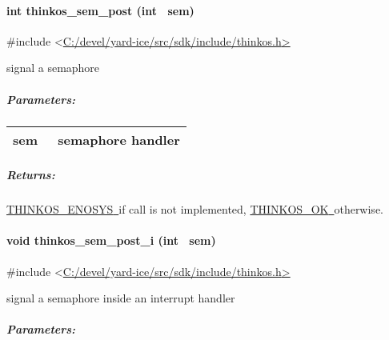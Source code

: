 {\paragraph{\texorpdfstring{{int thinkos\_sem\_post (int
~sem)}}{int thinkos\_sem\_post (int ~sem)}}\label{int-thinkos_sem_post-int-sem}

{}

{\#include
\textless{}}{\protect\hyperlink{h.pkwqa1}{C:/devel/yard-ice/src/sdk/include/thinkos.h}}{\protect\hyperlink{h.pkwqa1}{\textgreater{}}}

{signal a semaphore }

{}

\subparagraph{\texorpdfstring{{Parameters:}}{Parameters:}}\label{parameters-24}

\protect\hypertarget{t.42f0ad63e27678006eae2b4c683934157041a4d7}{}{}\protect\hypertarget{t.24}{}{}

\begin{longtable}[]{@{}ll@{}}
\toprule
\begin{minipage}[t]{0.47\columnwidth}\raggedright\strut
{sem}{~}\strut
\end{minipage} & \begin{minipage}[t]{0.47\columnwidth}\raggedright\strut
{semaphore handler }\strut
\end{minipage}\tabularnewline
\bottomrule
\end{longtable}

\subparagraph{\texorpdfstring{{Returns:}}{Returns:}}\label{returns-28}

{\protect\hyperlink{h.3s49zyc}{THINKOS\_ENOSYS}}{\protect\hyperlink{h.3s49zyc}{~}}{if
call is not implemented,
}{\protect\hyperlink{h.2fk6b3p}{THINKOS\_OK}}{\protect\hyperlink{h.2fk6b3p}{~}}{otherwise.
}

\paragraph{\texorpdfstring{{void thinkos\_sem\_post\_i (int
~sem)}}{void thinkos\_sem\_post\_i (int ~sem)}}\label{void-thinkos_sem_post_i-int-sem}

{}

{\#include
\textless{}}{\protect\hyperlink{h.pkwqa1}{C:/devel/yard-ice/src/sdk/include/thinkos.h}}{\protect\hyperlink{h.pkwqa1}{\textgreater{}}}

{signal a semaphore inside an interrupt handler }

{}

\subparagraph{\texorpdfstring{{Parameters:}}{Parameters:}}\label{parameters-25}

}
